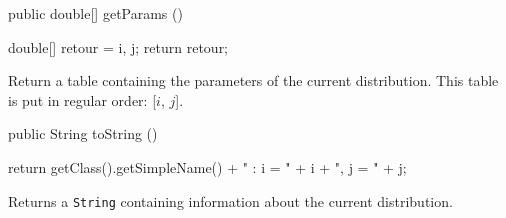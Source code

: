  \begin{code}

   public double[] getParams ()\begin{hide} {
      double[] retour = {i, j};
      return retour;
   }\end{hide}
\end{code}
\begin{tabb}
   Return a table containing the parameters of the current distribution.
   This table is put in regular order: [$i$, $j$].
\end{tabb}
\begin{hide}\begin{code}

   public String toString ()\begin{hide} {
      return getClass().getSimpleName() + " : i = " + i + ", j = " + j;
   }\end{hide}
\end{code}
\begin{tabb}
   Returns a \texttt{String} containing information about the current distribution.
\end{tabb}\end{hide}
\begin{code}\begin{hide}
}\end{hide}
\end{code}
